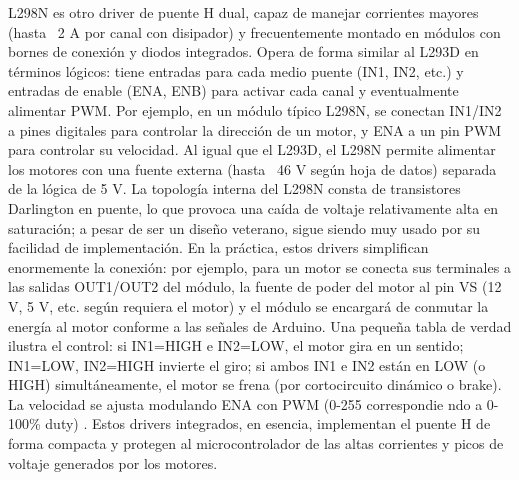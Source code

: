 L298N es otro driver de puente H dual, capaz de manejar corrientes mayores (hasta ~2 A por canal con disipador) y frecuentemente montado en módulos con bornes de conexión y diodos integrados. Opera de forma similar al L293D en términos lógicos: tiene entradas para cada medio puente (IN1, IN2, etc.) y entradas de enable (ENA, ENB) para activar cada canal y eventualmente alimentar PWM. Por ejemplo, en un módulo típico L298N, se conectan IN1/IN2 a pines digitales para controlar la dirección de un motor, y ENA a un pin PWM para controlar su velocidad\cite{Actuadores-2}. Al igual que el L293D, el L298N permite alimentar los motores con una fuente externa (hasta ~46 V según hoja de datos) separada de la lógica de 5 V. La topología interna del L298N consta de transistores Darlington en puente, lo que provoca una caída de voltaje relativamente alta en saturación; a pesar de ser un diseño veterano, sigue siendo muy usado por su facilidad de implementación. En la práctica, estos drivers simplifican enormemente la conexión: por ejemplo, para un motor se conecta sus terminales a las salidas OUT1/OUT2 del módulo, la fuente de poder del motor al pin VS (12 V, 5 V, etc. según requiera el motor) y el módulo se encargará de conmutar la energía al motor conforme a las señales de Arduino. Una pequeña tabla de verdad ilustra el control: si IN1=HIGH e IN2=LOW, el motor gira en un sentido; IN1=LOW, IN2=HIGH invierte el giro; si ambos IN1 e IN2 están en LOW (o HIGH) simultáneamente, el motor se frena (por cortocircuito dinámico o brake). La velocidad se ajusta modulando ENA con PWM (0-255 correspondie ndo a 0-100\% duty) \cite{Actuadores-2}. Estos drivers integrados, en esencia, implementan el puente H de forma compacta y protegen al microcontrolador de las altas corrientes y picos de voltaje generados por los motores.


